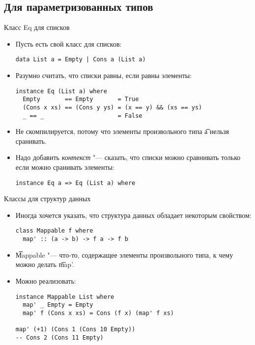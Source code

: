 \subsection{Для параметризованных типов}
\begin{frame}[fragile]{Класс Eq для списков}
	\begin{itemize}
		\item Пусть есть свой класс для списков:
\begin{verbatim}
data List a = Empty | Cons a (List a)
\end{verbatim}
		\item Разумно считать, что списки равны, если равны элементы:
\begin{verbatim}
instance Eq (List a) where
  Empty       == Empty       = True
  (Cons x xs) == (Cons y ys) = (x == y) && (xs == ys)
  _ == _                     = False
\end{verbatim}
		\item Не скомпилируется, потому что элементы произвольного типа \t{a} нельзя сранивать.
		\item Надо добавить \textit{контекст} "--- сказать, что списки можно сравнивать только если можно сранивать элементы:
\begin{verbatim}
instance Eq a => Eq (List a) where
\end{verbatim}
	\end{itemize}
\end{frame}

\begin{frame}[fragile]{Классы для структур данных}
	\begin{itemize}
		\item Иногда хочется указать, что структура данных обладает некоторым свойством:
\begin{verbatim}
class Mappable f where
  map' :: (a -> b) -> f a -> f b
\end{verbatim}
		\item \t{Mappable} "--- что-то, содержащее элементы произвольного типа, к чему можно делать \t{map'}.
		\item Можно реализовать:
\begin{verbatim}
instance Mappable List where
  map' _ Empty = Empty
  map' f (Cons x xs) = Cons (f x) (map' f xs)

map' (+1) (Cons 1 (Cons 10 Empty))
-- Cons 2 (Cons 11 Empty)
\end{verbatim}
	\end{itemize}
\end{frame}

